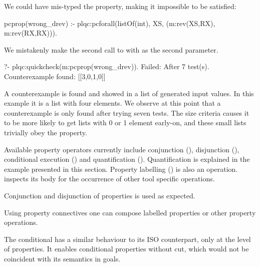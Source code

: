 We could have %
mis-typed the property, %
making
it impossible to be satisfied:
%
\begin{yapcode}
 pcprop(wrong_drev) :-
   plqc:pcforall(listOf(int), XS, (m:rev(XS,RX), m:rev(RX,RX))).
\end{yapcode}
%
We mistakenly make the second call to  with  as
the second parameter.
%
\begin{yapcode}
   ?- plqc:quickcheck(m:pcprop(wrong_drev)).
 Failed: After 7 test(s).
 Counterexample found: [[3,0,1,0]]
\end{yapcode}
A counterexample is found and showed in a list of generated input
values.
%
In this example it is %
a list with four elements.%
%
We observe at this point that a counterexample is only found
after trying seven tests.
%
The size criteria causes it to be more likely to get lists with 0 or 1
element early-on, and these small lists trivially obey the property.


Available property operators currently include conjunction (), disjunction (),
conditional execution () and quantification ().
%
%
Quantification is explained in the example presented in this section.
%
Property labelling () is also %
an operation.
%
%
\plqc{} inspects its body for the occurrence of other tool specific
operations.


Conjunction and disjunction of properties is used %
as expected.
%

Using property connectives one can compose labelled properties or %
other \plqc{} property operations.
%


The conditional  has a similar behaviour to its ISO
\Prolog{} counterpart, only at the level of \plqc{} properties.
%
It enables conditional properties without cut, which would not be
coincident with its semantics in \Prolog{} goals.



